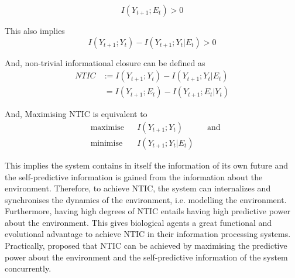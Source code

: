 \documentclass[utf8]{article}
\begin{document}
				\begin{equation}
				I(Y_{t+1};E_{t}) > 0
				\end{equation}

			\noindent
			This also implies
				\begin{equation}
					I(Y_{t+1};Y_{t})-I(Y_{t+1};Y_{t}|E_{t}) > 0
				\end{equation}



			\noindent
			And, non-trivial informational closure can be defined as
				\begin{equation}
				\label{eq:NTIC}
    				\left.\begin{array}
    				{rl}{NTIC} & {:=I(Y_{t+1};Y_{t})-I(Y_{t+1};Y_{t}|E_{t})}\\
    				{ } & {\ =I(Y_{t+1};E_{t})-I(Y_{t+1};E_{t}|Y_{t})}
    				\end{array} \right.
				\end{equation}

			\noindent
			And, Maximising NTIC is equivalent to
				\begin{equation}
    				\label{eq:nticObjective}
    				\begin{aligned}
    				& \text{maximise} & { } & I(Y_{t+1};Y_{t}) & { } & \text{and} \\
    				& \text{minimise} & { } & I(Y_{t+1};Y_{t}|E_{t}) & { }
    				\end{aligned}
				\end{equation}

			\noindent
			This implies the system contains in itself the information of its own future and the self-predictive information is gained from the information about the environment. Therefore, to achieve NTIC, the system can internalizes and synchronises the dynamics of the environment, i.e. modelling the environment. Furthermore, having high degrees of NTIC entails having high predictive power about the environment. This gives biological agents a great functional and evolutional advantage to achieve NTIC in their information processing systems. Practically, \cite{guttenberg2016neural} proposed that NTIC can be achieved by maximising the predictive power about the environment and the self-predictive information of the system concurrently.
\end{document}

